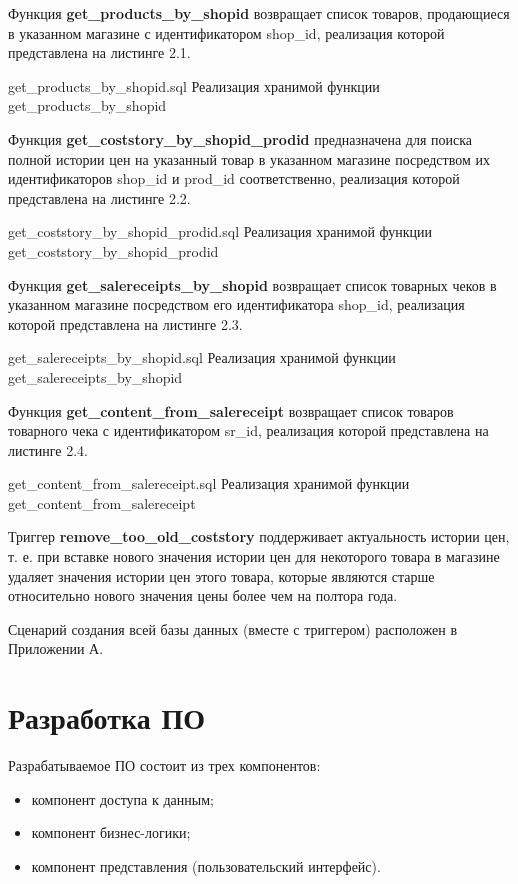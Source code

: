 \documentclass[a4paper]{bmstu}
\begin{document}
Функция \textbf{get\_products\_by\_shopid} возвращает список товаров, продающиеся в указанном магазине с идентификатором shop\_id, реализация которой представлена на листинге 2.1.

\newpage

	{get_products_by_shopid.sql}
	{Реализация хранимой функции get\_products\_by\_shopid}

Функция \textbf{get\_coststory\_by\_shopid\_prodid} предназначена для поиска полной истории цен на указанный товар в указанном магазине посредством их идентификаторов shop\_id и prod\_id соответственно, реализация которой представлена на листинге 2.2.

	{get_coststory_by_shopid_prodid.sql}
	{Реализация хранимой функции get\_coststory\_by\_shopid\_prodid}

Функция \textbf{get\_salereceipts\_by\_shopid} возвращает список товарных чеков в указанном магазине посредством его идентификатора shop\_id, реализация которой представлена на листинге 2.3.

\newpage

	{get_salereceipts_by_shopid.sql}
	{Реализация хранимой функции get\_salereceipts\_by\_shopid}

Функция \textbf{get\_content\_from\_salereceipt} возвращает список товаров товарного чека с идентификатором sr\_id, реализация которой представлена на листинге 2.4.

	{get_content_from_salereceipt.sql}
	{Реализация хранимой функции get\_content\_from\_salereceipt}

Триггер \textbf{remove\_too\_old\_coststory} поддерживает актуальность истории цен, т. е. при вставке нового значения истории цен для некоторого товара в магазине удаляет значения истории цен этого товара, которые являются старше относительно нового значения цены более чем на полтора года.

Сценарий создания всей базы данных (вместе с триггером) расположен в Приложении А.

\section{Разработка ПО}

Разрабатываемое ПО состоит из трех компонентов:

\begin{itemize}
	\item компонент доступа к данным;
	\item компонент бизнес-логики;
	\item компонент представления (пользовательский интерфейс).
\end{itemize}
\end{document}
